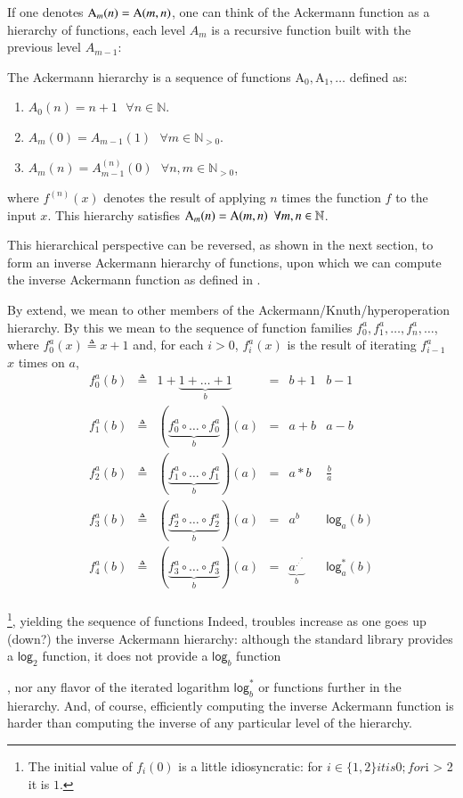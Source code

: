 If one denotes {\color{magenta}$\text{A}_m(n) = \text{A}(m, n)$}, one can think
of the Ackermann function as a hierarchy of functions, each
level $A_m$ is a recursive function built with the previous
level $A_{m-1}$:

\begin{defn} \label{defn: ack_hier}
	The Ackermann hierarchy is a sequence of functions
	$\text{A}_0, \text{A}_1, \ldots $ defined as:
	\begin{enumerate}
		\item $A_0(n) = n + 1 \ \ \ \forall n\in \mathbb{N}$.
		\item $A_m(0) = A_{m-1}(1) \ \ \ \forall m\in \mathbb{N}_{>0}$.
		\item $A_{m}(n) = A_{m-1}^{(n)}(0) \ \ \ \forall n, m\in \mathbb{N}_{>0}$,
	\end{enumerate}
	\noindent where $f^{(n)}(x)$ {\color{magenta}denotes
	the result of applying $n$ times the function $f$ to
	the input $x$.} This hierarchy satisfies
	$\text{A}_m(n) = \text{A}(m, n) \ \ \forall m, n\in \mathbb{N}$.
\end{defn}

This hierarchical perspective can be reversed, as shown in the
next section, to form an inverse Ackermann hierarchy of functions,
upon which we can compute the inverse Ackermann function as
defined in . 

By extend, we mean to other members of the Ackermann/Knuth/hyperoperation hierarchy.  By this we
mean to the sequence of function families $f^a_0, f^a_1, \ldots, f^a_n, \ldots$, where $f^a_0(x) \triangleq x + 1$ and, for each $i > 0$, $f^a_i(x)$ is the result of iterating $f^a_{i-1}$ $x$ times
on $a$,
\[
\begin{array}{cclcl|c}
f^a_0(b) & \triangleq & 1 + \underbrace{1 + \ldots + 1}_b & = & b + 1 & b - 1 \\
f^a_1(b) & \triangleq & (\underbrace{f^a_0 \circ \ldots \circ f^a_0}_b)(a) & = & a + b & a - b \\
f^a_2(b) & \triangleq & (\underbrace{f^a_1 \circ \ldots \circ f^a_1}_b)(a) & = & a * b & \frac{b}{a} \\
f^a_3(b) & \triangleq & (\underbrace{f^a_2 \circ \ldots \circ f^a_2}_b)(a) & = & a^b & \mathsf{log}_a(b) \\
f^a_4(b) & \triangleq & (\underbrace{f^a_3 \circ \ldots \circ f^a_3}_b)(a) & = & \underbrace{a^{.^{.^{.^a}}}}_b & \mathsf{log}^*_a(b)  \\
\end{array}
\]

\footnote{The initial
value of $f_i(0)$ is a little idiosyncratic: for $i \in \{1,2\} it is $0$; for $i > 2 it is $1$.}, yielding the sequence of functions
  Indeed, troubles increase 
as one goes up (down?) the
inverse Ackermann hierarchy: although the standard library provides a $\mathsf{log}_2$ 
function, it does not provide a $\mathsf{log}_b$ function

, nor 
any flavor of the iterated logarithm $\mathsf{log}_b^{*}$ or functions further in the hierarchy.
And, of course, efficiently computing the inverse Ackermann function is harder
than computing the inverse of any particular level of the hierarchy.

